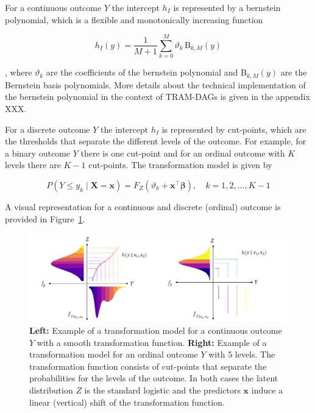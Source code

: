 For a continuous outcome $Y$ the intercept $h_I$ is represented by a bernstein polynomial, which is a flexible and monotonically increasing function

\begin{equation}
h_I(y) = \frac{1}{M + 1} \sum_{k=0}^{M} \vartheta_k \, \text{B}_{k, M}(y)
\end{equation}

, where $\vartheta_k$ are the coefficients of the bernstein polynomial and $\text{B}_{k, M}(y)$ are the Bernstein basis polynomials. More details about the technical implementation of the bernstein polynomial in the context of TRAM-DAGs is given in the appendix XXX.

For a discrete outcome $Y$ the intercept $h_I$ is represented by cut-points, which are the thresholds that separate the different levels of the outcome. For example, for a binary outcome $Y$ there is one cut-point and for an ordinal outcome with $K$ levels there are $K-1$ cut-points. The transformation model is given by

\begin{equation}
P(Y \leq y_k \mid \mathbf{X} = \mathbf{x}) = F_Z(\vartheta_k + \mathbf{x}^\top \boldsymbol{\beta}), \quad k = 1, 2, \ldots, K - 1
\end{equation}


A visual representation for a continuous and discrete (ordinal) outcome is provided in Figure~\ref{fig:tram_cont_ord}.


\begin{figure}[H]
\centering
\includegraphics[width=1\textwidth]{img/tram_cont_ord.png}
\caption{\textbf{Left:} Example of a transformation model for a continuous outcome $Y$ with a smooth transformation function. \textbf{Right:} Example of a transformation model for an ordinal outcome $Y$ with 5 levels. The transformation function consists of cut-points that separate the probabilities for the levels of the outcome.
In both cases the latent distribution $Z$ is the standard logistic and the predictors $\mathbf{x}$ induce a linear (vertical) shift of the transformation function.}
\label{fig:tram_cont_ord}
\end{figure}


